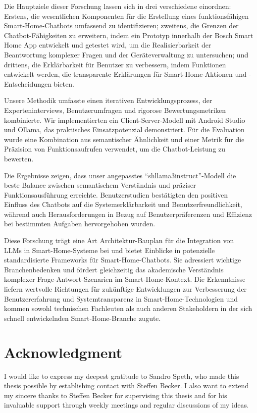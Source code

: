 \documentclass[
  a4paper,  %
  twoside,  %
  bibliography=totoc,
  headsepline,
  cleardoublepage=empty,
  parskip=half,
  draft=false
]{scrbook}
\begin{document}
Die Hauptziele dieser Forschung lassen sich in drei verschiedene einordnen: Erstens, die wesentlichen Komponenten für die Erstellung eines funktionsfähigen Smart-Home-Chatbots umfassend zu identifizieren; zweitens, die Grenzen der Chatbot-Fähigkeiten zu erweitern, indem ein Prototyp innerhalb der Bosch Smart Home App entwickelt und getestet wird, um die Realisierbarkeit der Beantwortung komplexer Fragen und der Geräteverwaltung zu untersuchen; und drittens, die Erklärbarkeit für Benutzer zu verbessern, indem Funktionen entwickelt werden, die transparente Erklärungen für Smart-Home-Aktionen und -Entscheidungen bieten.

Unsere Methodik umfasste einen iterativen Entwicklungsprozess, der Experteninterviews, Benutzerumfragen und rigorose Bewertungsmetriken kombinierte. Wir implementierten ein Client-Server-Modell mit Android Studio und Ollama, das praktisches Einsatzpotenzial demonstriert. Für die Evaluation wurde eine Kombination aus semantischer Ähnlichkeit und einer Metrik für die Präzision von Funktionsaufrufen verwendet, um die Chatbot-Leistung zu bewerten.

Die Ergebnisse zeigen, dass unser angepasstes ``shllama3instruct''-Modell die beste Balance zwischen semantischem Verständnis und präziser Funktionsausführung erreichte. Benutzerstudien bestätigten den positiven Einfluss des Chatbots auf die Systemerklärbarkeit und Benutzerfreundlichkeit, während auch Herausforderungen in Bezug auf Benutzerpräferenzen und Effizienz bei bestimmten Aufgaben hervorgehoben wurden.

Diese Forschung trägt eine Art Architektur-Bauplan für die Integration von LLMs in Smart-Home-Systeme bei und bietet Einblicke in potenzielle standardisierte Frameworks für Smart-Home-Chatbots. Sie adressiert wichtige Branchenbedenken und fördert gleichzeitig das akademische Verständnis komplexer Frage-Antwort-Szenarien im Smart-Home-Kontext. Die Erkenntnisse liefern wertvolle Richtungen für zukünftige Entwicklungen zur Verbesserung der Benutzererfahrung und Systemtransparenz in Smart-Home-Technologien und kommen sowohl technischen Fachleuten als auch anderen Stakeholdern in der sich schnell entwickelnden Smart-Home-Branche zugute.
\cleardoublepage


\section*{Acknowledgment}
I would like to express my deepest gratitude to Sandro Speth, who made this thesis possible by establishing contact with Steffen Becker. I also want to extend my sincere thanks to Steffen Becker for supervising this thesis and for his invaluable support through weekly meetings and regular discussions of my ideas.
\end{document}
